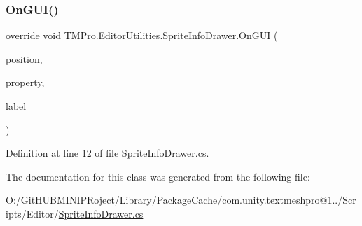 \subsubsection{\texorpdfstring{OnGUI()}{OnGUI()}}
{\footnotesize\ttfamily override void T\+M\+Pro.\+Editor\+Utilities.\+Sprite\+Info\+Drawer.\+On\+G\+UI (\begin{DoxyParamCaption}\item[{Rect}]{position,  }\item[{Serialized\+Property}]{property,  }\item[{G\+U\+I\+Content}]{label }\end{DoxyParamCaption})}



Definition at line 12 of file Sprite\+Info\+Drawer.\+cs.



The documentation for this class was generated from the following file\+:\begin{DoxyCompactItemize}
\item 
O\+:/\+Git\+H\+U\+B\+M\+I\+N\+I\+P\+Roject/\+Library/\+Package\+Cache/com.\+unity.\+textmeshpro@1../\+Scripts/\+Editor/\mbox{\hyperlink{_sprite_info_drawer_8cs}{Sprite\+Info\+Drawer.\+cs}}\end{DoxyCompactItemize}
